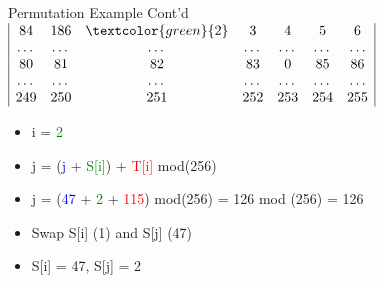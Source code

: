 \documentclass[
	aspectratio=169,	%
	onlytextwidth,		%
	t,					%
	]{beamer}
\begin{document}
\begin{frame}{Permutation Example Cont'd}
	$\begin{array}{|ccccccc|}
		84 & 186 & \textcolor{green}{2} & 3 & 4 & 5 & 6 \\
		\dots & \dots & \dots & \dots & \dots & \dots & \dots \\
		80 & 81 & 82 & 83 & 0 & 85 & 86 \\
		\dots & \dots & \dots & \dots & \dots & \dots & \dots \\
		249 & 250 & 251 & 252 & 253 & 254 & 255 \\
	\end{array}$
	\begin{itemize}
		\item i = \textcolor{green}{2}
		\item j = (\textcolor{blue} {j} + \textcolor{green}{S[i]}) + \textcolor{red}{T[i]} mod(256)
		\item j = (\textcolor{blue} {47} + \textcolor{green} {2} + \textcolor{red} {115}) mod(256) = 126 mod (256) = 126
		\item Swap S[i] (1) and S[j] (47)
		\item S[i] = 47, S[j] = 2
	\end{itemize}
\end{frame}
\end{document}
